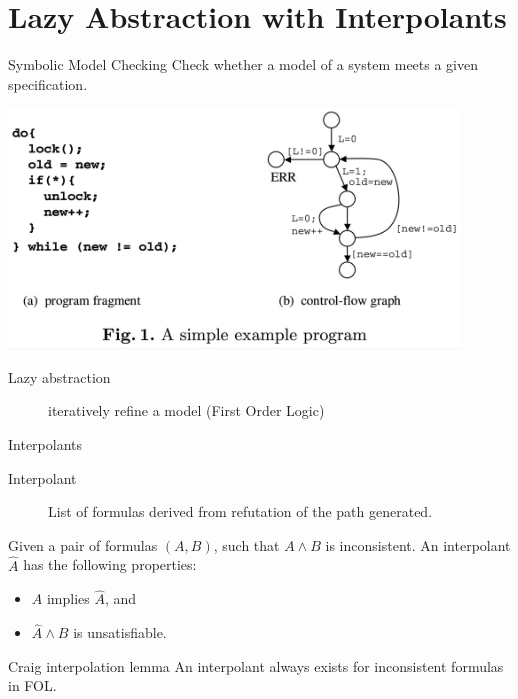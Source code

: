 \documentclass{beamer}
\begin{document}
\section{Lazy Abstraction with Interpolants}

\begin{frame}{Symbolic Model Checking}
  Check whether a model of a system meets a given specification.

  \includegraphics[width=0.9\textwidth]{interpolants_fig1.png}

  \begin{description}
    \item[Lazy abstraction] iteratively refine a model (First Order Logic)
  \end{description}
\end{frame}

\begin{frame}{Interpolants}
  \begin{description}
    \item[Interpolant] List of formulas derived from refutation of the path generated.
  \end{description}

  Given a pair of formulas $(A, B)$, such that $A \wedge B$ is inconsistent.
  An interpolant $\hat{A}$ has the following properties:
  \begin{itemize}
    \item $A$ implies $\hat{A}$, and
    \item $\hat{A} \wedge B$ is unsatisfiable.
  \end{itemize}

  \begin{block}{Craig interpolation lemma}
    An interpolant always exists for inconsistent formulas in FOL.
  \end{block}
\end{frame}
\end{document}
